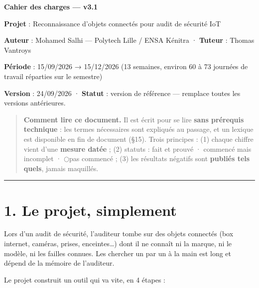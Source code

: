 \documentclass[11pt,a4paper]{article}
\newcommand{\fait}{\textcolor{green!45!black}{\ding{51}}}      %
\newcommand{\encours}{\textcolor{blue!65!black}{\ding{46}}}   %
\newcommand{\afaire}{\textcolor{orange!85!black}{$\bigcirc$}}  %
\begin{document}
\begin{center}{\LARGE\bfseries Cahier des charges — v3.1\par}\end{center}\vspace{4pt}
\begin{flushleft}\textbf{Projet} : Reconnaissance d'objets connectés pour audit de sécurité IoT\end{flushleft}

\begin{flushleft}\textbf{Auteur} : Mohamed Salhi — Polytech Lille / ENSA Kénitra · \textbf{Tuteur} : Thomas Vantroys\end{flushleft}

\begin{flushleft}\textbf{Période} : 15/09/2026 → 15/12/2026 (13 semaines, environ 60 à 73 journées de travail réparties sur le semestre)\end{flushleft}

\textbf{Version} : 24/09/2026 · \textbf{Statut} : version de référence — remplace toutes les versions antérieures.

\begin{quote}\small \textbf{Comment lire ce document.} Il est écrit pour se lire \textbf{sans prérequis technique} : les termes nécessaires sont expliqués au passage, et un lexique est disponible en fin de document (§15). Trois principes : (1) chaque chiffre vient d'une \textbf{mesure datée} ; (2) statuts : \fait fait et prouvé · \encours commencé mais incomplet · \afaire pas commencé ; (3) les résultats négatifs sont \textbf{publiés tels quels}, jamais maquillés.\end{quote}
\medskip\hrule\medskip
\section*{1. Le projet, simplement}
Lors d'un audit de sécurité, l'auditeur tombe sur des objets connectés (box internet, caméras, prises, enceintes…) dont il ne connaît ni la marque, ni le modèle, ni les failles connues. Les chercher un par un à la main est long et dépend de la mémoire de l'auditeur.

Le projet construit un outil qui va vite, en 4 étapes :
\end{document}
